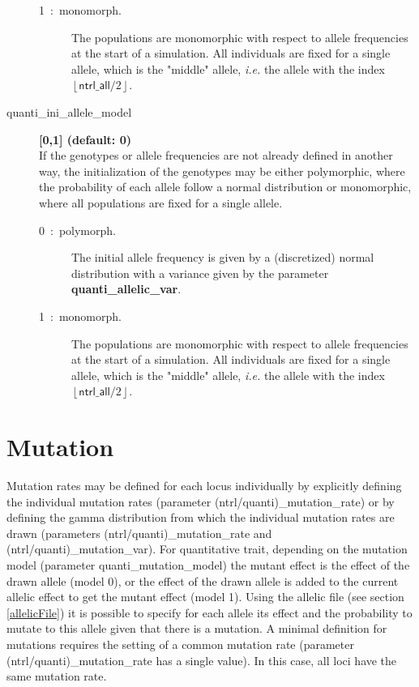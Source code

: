 \documentclass[letterpaper,12pt,oneside]{book}
\begin{document}
\begin{description}
\begin{description}
\item[1~:~monomorph.] The populations are monomorphic with respect to allele frequencies at the start of a simulation. All individuals are fixed for a single allele, which is  the "middle" allele, \textit{i.e.} the allele with the index $\left\lfloor \textsf{ntrl\_all}/2\right\rfloor$.

\end{description}

\item[quanti\_ini\_allele\_model\index{quanti\_ini\_allele\_model}] \textbf{[0,1] (default: 0)}\\

If the genotypes or allele frequencies are not already defined in another way, the initialization of the genotypes may be either polymorphic, where the probability of each allele follow a normal distribution or monomorphic, where all populations are fixed for a single allele.  

\begin{description}

\item[0~:~polymorph.] The initial allele frequency is given by a (discretized) normal distribution with a variance given by the parameter \textbf{quanti\_allelic\_var}.

\item[1~:~monomorph.] The populations are monomorphic with respect to allele frequencies at the start of a simulation. All individuals are fixed for a single allele, which is  the "middle" allele, \textit{i.e.} the allele with the index $\left\lfloor \textsf{ntrl\_all}/2\right\rfloor$.

\end{description}
\end{description}

\section{Mutation}
Mutation rates may be defined for each locus individually by explicitly defining the individual mutation rates (parameter \textsf{(ntrl/quanti)\_mutation\_rate}) or by defining the gamma distribution from which the individual mutation rates are drawn (parameters \textsf{(ntrl/quanti)\_mutation\_rate} and \textsf{(ntrl/quanti)\_mutation\_var}). For quantitative trait, depending on the mutation model (parameter \textsf{quanti\_mutation\_model}) the mutant effect is the effect of the drawn allele (model 0), or the effect of the drawn allele is added to the current allelic effect to get the mutant effect (model 1). Using the allelic file (see section \ref{allelicFile}) it is possible to specify for each allele its effect and the probability to mutate to this allele given that there is a mutation. A minimal definition for mutations requires the setting of a common mutation rate (parameter \textsf{(ntrl/quanti)\_mutation\_rate} has a single value). In this case, all loci have the same mutation rate.
\end{document}
